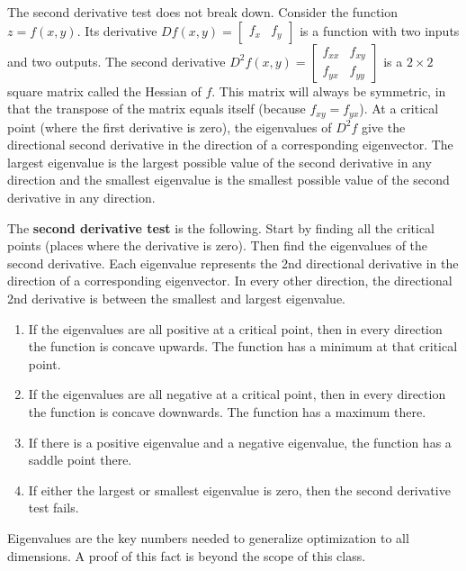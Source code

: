The second derivative test does not break down. Consider the function $z=f(x,y)$. Its derivative $Df(x,y) = \begin{bmatrix}f_x&f_y\end{bmatrix}$ is a function with two inputs and two outputs. The second derivative {$D^2f (x,y)= \begin{bmatrix}f_{xx}&f_{xy}\\f_{yx}&f_{yy}\end{bmatrix} $} is a {$2\times 2$} square matrix called the Hessian of $f$. This matrix will always be symmetric, in that the transpose of the matrix equals itself (because $f_{xy}=f_{yx}$).  At a critical point (where the first derivative is zero), the eigenvalues of $D^2f$ give the directional second derivative in the direction of a corresponding eigenvector. The largest eigenvalue is the largest possible value of the second derivative in any direction and the smallest eigenvalue is the smallest possible value of the second derivative in any direction. 

The \textbf{second derivative test}  is the following. Start by finding all the critical points (places where the derivative is zero). Then find the eigenvalues of the second derivative. Each eigenvalue represents the 2nd directional derivative in the direction of a corresponding eigenvector. In every other direction, the directional 2nd derivative is between the smallest and largest eigenvalue.  
\begin{enumerate}
	\item If the eigenvalues are all positive at a critical point, then in every direction the function is concave upwards. The function has a minimum at that critical point.
	\item If the eigenvalues are all negative at a critical point, then in every direction the function is concave downwards. The function has a maximum there.
	\item If there is a positive eigenvalue and a negative eigenvalue, the function has a saddle point there.  
	\item If either the largest or smallest eigenvalue is zero, then the second derivative test fails. 
\end{enumerate}
Eigenvalues are the key numbers needed to generalize optimization to all dimensions. A proof of this fact is beyond the scope of this class. 

